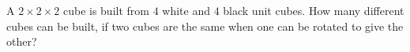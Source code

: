 A $2\times2\times2$ cube is built from $4$ white and $4$ black unit cubes. How many different cubes can be built, if two cubes are the same when one can be rotated to give the other?
